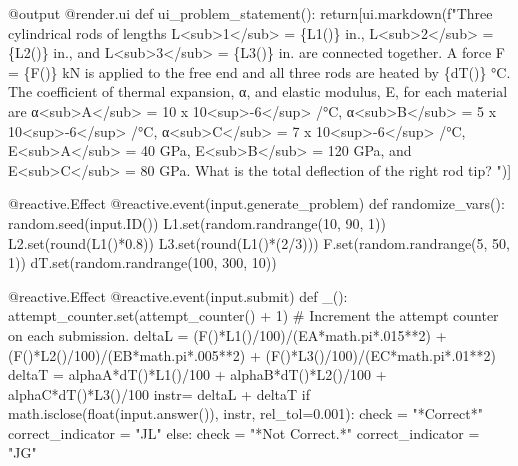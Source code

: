 \documentclass[
  letterpaper,
  DIV=11,
  numbers=noendperiod]{scrreprt}
\newenvironment{Shaded}{\begin{snugshade}}{\end{snugshade}}
\newcommand{\NormalTok}[1]{\textcolor[rgb]{0.00,0.23,0.31}{#1}}
\begin{document}
\begin{Shaded}
\begin{Highlighting}[]
\NormalTok{    @output}
\NormalTok{    @render.ui}
\NormalTok{    def ui\_problem\_statement():}
\NormalTok{        return[ui.markdown(f"Three cylindrical rods of lengths L\textless{}sub\textgreater{}1\textless{}/sub\textgreater{} = \{L1()\} in., L\textless{}sub\textgreater{}2\textless{}/sub\textgreater{} = \{L2()\} in., and L\textless{}sub\textgreater{}3\textless{}/sub\textgreater{} = \{L3()\} in. are connected together. A force F = \{F()\} kN is applied to the free end and all three rods are heated by \{dT()\} °C. The coefficient of thermal expansion, α, and elastic modulus, E, for each material are α\textless{}sub\textgreater{}A\textless{}/sub\textgreater{} = 10 x 10\textless{}sup\textgreater{}{-}6\textless{}/sup\textgreater{} /°C, α\textless{}sub\textgreater{}B\textless{}/sub\textgreater{} = 5 x 10\textless{}sup\textgreater{}{-}6\textless{}/sup\textgreater{} /°C, α\textless{}sub\textgreater{}C\textless{}/sub\textgreater{} = 7 x 10\textless{}sup\textgreater{}{-}6\textless{}/sup\textgreater{} /°C, E\textless{}sub\textgreater{}A\textless{}/sub\textgreater{} = 40 GPa, E\textless{}sub\textgreater{}B\textless{}/sub\textgreater{} = 120 GPa, and E\textless{}sub\textgreater{}C\textless{}/sub\textgreater{} = 80 GPa. What is the total deflection of the right rod tip?  ")]}
    
\NormalTok{    @reactive.Effect}
\NormalTok{    @reactive.event(input.generate\_problem)}
\NormalTok{    def randomize\_vars():}
\NormalTok{        random.seed(input.ID())}
\NormalTok{        L1.set(random.randrange(10, 90, 1))}
\NormalTok{        L2.set(round(L1()*0.8))}
\NormalTok{        L3.set(round(L1()*(2/3)))}
\NormalTok{        F.set(random.randrange(5, 50, 1))}
\NormalTok{        dT.set(random.randrange(100, 300, 10))}
        
\NormalTok{    @reactive.Effect}
\NormalTok{    @reactive.event(input.submit)}
\NormalTok{    def \_():}
\NormalTok{        attempt\_counter.set(attempt\_counter() + 1)  \# Increment the attempt counter on each submission.}
\NormalTok{        deltaL = (F()*L1()/100)/(EA*math.pi*.015**2) + (F()*L2()/100)/(EB*math.pi*.005**2) + (F()*L3()/100)/(EC*math.pi*.01**2)}
\NormalTok{        deltaT = alphaA*dT()*L1()/100 + alphaB*dT()*L2()/100 + alphaC*dT()*L3()/100 }
\NormalTok{        instr= deltaL + deltaT}
\NormalTok{        if math.isclose(float(input.answer()), instr, rel\_tol=0.001):}
\NormalTok{            check = "*Correct*"}
\NormalTok{            correct\_indicator = "JL"}
\NormalTok{        else:}
\NormalTok{            check = "*Not Correct.*"}
\NormalTok{            correct\_indicator = "JG"}


\end{Highlighting}
\end{Shaded}
\end{document}
